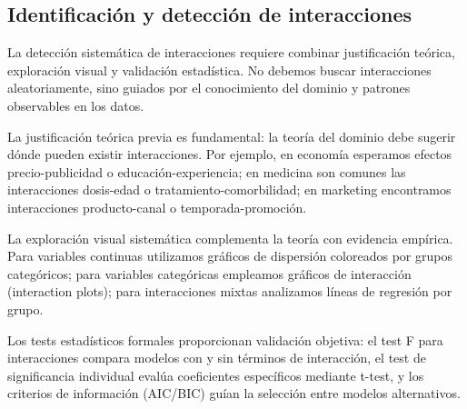 \documentclass[
  letterpaper,
  DIV=11,
  numbers=noendperiod]{scrreprt}
\begin{document}
\subsection{Identificación y detección de
interacciones}\label{identificaciuxf3n-y-detecciuxf3n-de-interacciones}

La detección sistemática de interacciones requiere combinar
justificación teórica, exploración visual y validación estadística. No
debemos buscar interacciones aleatoriamente, sino guiados por el
conocimiento del dominio y patrones observables en los datos.

La justificación teórica previa es fundamental: la teoría del dominio
debe sugerir dónde pueden existir interacciones. Por ejemplo, en
economía esperamos efectos precio-publicidad o educación-experiencia; en
medicina son comunes las interacciones dosis-edad o
tratamiento-comorbilidad; en marketing encontramos interacciones
producto-canal o temporada-promoción.

La exploración visual sistemática complementa la teoría con evidencia
empírica. Para variables continuas utilizamos gráficos de dispersión
coloreados por grupos categóricos; para variables categóricas empleamos
gráficos de interacción (interaction plots); para interacciones mixtas
analizamos líneas de regresión por grupo.

Los tests estadísticos formales proporcionan validación objetiva: el
test F para interacciones compara modelos con y sin términos de
interacción, el test de significancia individual evalúa coeficientes
específicos mediante t-test, y los criterios de información (AIC/BIC)
guían la selección entre modelos alternativos.
\end{document}
